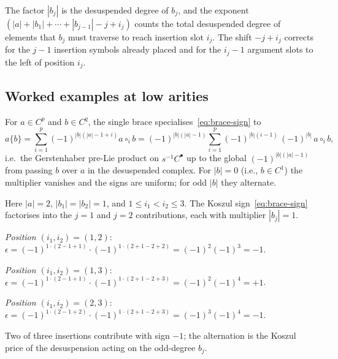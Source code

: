 \begin{remark}
The factor $|b_j|$ is the desuspended degree of $b_j$, and the exponent $(|a| + |b_1| + \cdots + |b_{j-1}| - j + i_j)$ counts the total desuspended degree of elements that $b_j$ must traverse to reach insertion slot $i_j$. The shift $-j + i_j$ corrects for the $j - 1$ insertion symbols already placed and for the $i_j - 1$ argument slots to the left of position $i_j$.
\end{remark}


\subsection{Worked examples at low arities}

\begin{example}
For $a \in C^p$ and $b \in C^q$, the single brace specialises~\eqref{eq:brace-sign} to
\[
a\{b\} = \sum_{i=1}^{p} (-1)^{|b|(|a| - 1 + i)} a \circ_i b
       = (-1)^{|b|(|a|-1)}\sum_{i=1}^{p} (-1)^{|b|(i-1)}\,(-1)^{|b|}\, a \circ_i b,
\]
i.e.\ the Gerstenhaber pre-Lie product on $s^{-1}C^\bullet$ up to the global $(-1)^{|b|(|a|-1)}$ from passing $b$ over $a$ in the desuspended complex. For $|b| = 0$ (i.e., $b \in C^1$) the multiplier vanishes and the signs are uniform; for odd $|b|$ they alternate.
\end{example}

\begin{example}
\label{ex:double-brace}
Here $|a| = 2$, $|b_1| = |b_2| = 1$, and $1 \le i_1 < i_2 \le 3$. The Koszul sign~\eqref{eq:brace-sign} factorises into the $j = 1$ and $j = 2$ contributions, each with multiplier $|b_j| = 1$.

\emph{Position $(i_1, i_2) = (1,2)$}: $\epsilon = (-1)^{1 \cdot (2 - 1 + 1)} \cdot (-1)^{1 \cdot (2 + 1 - 2 + 2)} = (-1)^2 (-1)^3 = -1$.

\emph{Position $(i_1, i_2) = (1,3)$}: $\epsilon = (-1)^{1 \cdot (2 - 1 + 1)} \cdot (-1)^{1 \cdot (2 + 1 - 2 + 3)} = (-1)^2 (-1)^4 = +1$.

\emph{Position $(i_1, i_2) = (2,3)$}: $\epsilon = (-1)^{1 \cdot (2 - 1 + 2)} \cdot (-1)^{1 \cdot (2 + 1 - 2 + 3)} = (-1)^3 (-1)^4 = -1$.

Two of three insertions contribute with sign $-1$; the alternation is the Koszul price of the desuspension acting on the odd-degree $b_j$.
\end{example}

